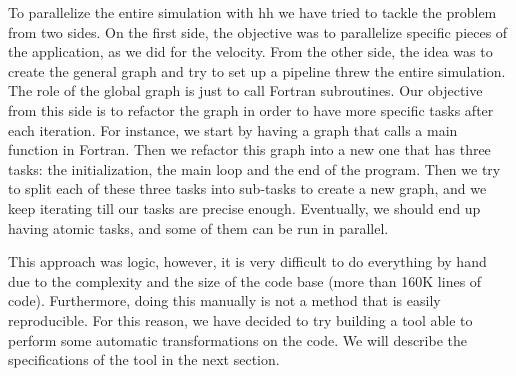 To parallelize the entire simulation with \gls{hh} we have tried to tackle the
problem from two sides. On the first side, the objective was to parallelize
specific pieces of the application, as we did for the velocity. From the other
side, the idea was to create the general graph and try to set up a pipeline
threw the entire simulation. The role of the global graph is just to call
Fortran subroutines. Our objective from this side is to refactor the graph in
order to have more specific tasks after each iteration. For instance, we start
by having a graph that calls a main function in Fortran. Then we refactor this
graph into a new one that has three tasks: the initialization, the main loop and
the end of the program. Then we try to split each of these three tasks into
sub-tasks to create a new graph, and we keep iterating till our tasks are
precise enough. Eventually, we should end up having atomic tasks, and some of
them can be run in parallel.

This approach was logic, however, it is very difficult to do everything by hand
due to the complexity and the size of the code base (more than 160K lines of
code). Furthermore, doing this manually is not a method that is easily
reproducible. For this reason, we have decided to try building a tool able to
perform some automatic transformations on the code. We will describe the
specifications of the tool in the next section.
